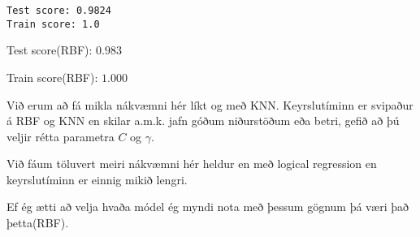 \documentclass[11pt]{article}
\begin{document}
    \begin{Verbatim}[commandchars=\\\{\}]
Test score: 0.9824
Train score: 1.0

    \end{Verbatim}

    Test score(RBF): \(0.983\)

Train score(RBF): \(1.000\)

Við erum að fá mikla nákvæmni hér líkt og með KNN. Keyrslutíminn er
svipaður á RBF og KNN en skilar a.m.k. jafn góðum niðurstöðum eða betri,
gefið að þú veljir rétta parametra \(C\) og \(\gamma\).

Við fáum töluvert meiri nákvæmni hér heldur en með logical regression en
keyrslutíminn er einnig mikið lengri.

Ef ég ætti að velja hvaða módel ég myndi nota með þessum gögnum þá væri
það þetta(RBF).


    
    
    
    
\end{document}
